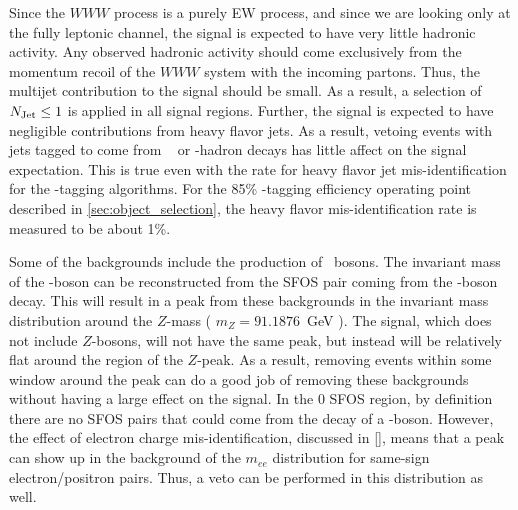 




Since the $WWW$ process is a purely EW process, and since
we are looking only at the fully leptonic channel, the 
signal is expected to have very little hadronic 
activity. Any observed hadronic activity should come exclusively
from the momentum recoil of the $WWW$ system with the incoming
partons. Thus, the multijet contribution to the signal
should be small. As a result, a selection of $N_{\textrm{Jet}} \leq 1$
is applied in all signal regions.
Further, the signal is 
expected to have negligible contributions
from heavy flavor jets. As a result, vetoing events with jets
tagged to come from \bee~ or \bee-hadron decays has
little affect on the signal expectation. This is true even with 
the rate for heavy flavor jet mis-identification for the 
\bee-tagging algorithms. For the 
85\% \bee-tagging efficiency operating point described in 
\sec\ref{sec:object_selection}, the heavy flavor
mis-identification rate is measured to be about 1\%. %


Some of the backgrounds include the production of \z~bosons.
The invariant mass of the \z-boson can be reconstructed from the SFOS
pair coming from the \z-boson decay. 
This will result in a peak from these backgrounds
in the invariant mass distribution around 
the $Z$-mass ( $m_{Z}=91.1876$~GeV \cite{PDG:2014}).
The signal, which does not include $Z$-bosons, 
will not have the same peak, but instead
will be relatively flat around the region of the $Z$-peak. 
As a result, removing events within some window around the peak can do a good job
of removing these backgrounds without having a large effect on the signal.
In the 0 SFOS region, by definition there are no SFOS pairs that could come 
from the decay of a \z-boson. 
However, the effect of electron charge mis-identification,
discussed in \sec\ref{}, means that a peak can show up in the background
of the $m_{ee}$ distribution for same-sign electron/positron pairs. 
Thus, a veto can be performed in this distribution as well.


